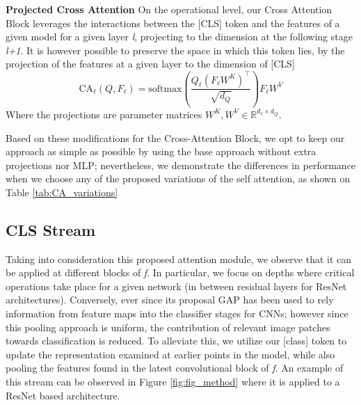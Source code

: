\noindent\textbf{Projected Cross Attention}
On the operational level, our Cross Attention Block leverages the interactions between the [CLS] token and the features of a given model for a given layer \textit{l}, projecting to the dimension at the following stage \textit{l+1}. It is however possible to preserve the space in which this token lies, by the projection of the features at a given layer to the dimension of [CLS]
\begin{equation}
    \mbox{CA}_\ell(Q, F_{\ell}) = \mbox{softmax}(\frac{Q_{\ell}(F_{\ell}W^K)^\top}{\sqrt{d_Q}})F_{\ell}W^V
\end{equation}
Where the projections are parameter matrices $W^K, W^V \in \mathbb{R}^{d_\ell\times d_Q}$.

Based on these modifications for the Cross-Attention Block, we opt to keep our approach as simple as possible by using the base approach without extra projections nor MLP; nevertheless, we demonstrate the differences in performance when we choose any of the proposed variations of the self attention, as shown on Table \ref{tab:CA_variations}
 
\subsection{CLS Stream}
\noindent Taking into consideration this proposed attention module, we observe that it can be applied at different blocks of \textit{f}. In particular, we focus on depths where critical operations take place for a given network (\ie in between residual layers for ResNet architectures). Conversely, ever since its proposal GAP has been used to rely information from feature maps into the classifier stages for CNNs; however since this pooling approach is uniform, the contribution of relevant image patches towards classification is reduced. To alleviate this, we utilize our {[class]} token to update the representation examined at earlier points in the model, while also pooling the features found in the latest convolutional block of \textit{f}. An example of this stream can be observed in Figure \ref{fig:fig_method} where it is applied to a ResNet based architecture.


